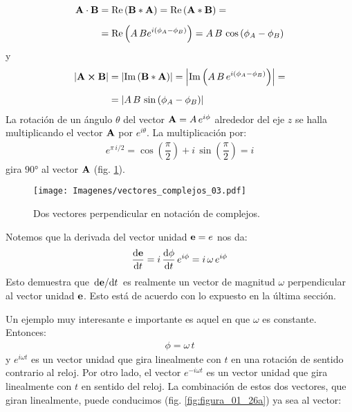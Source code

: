 \documentclass[12pt]{article}
\begin{document}
\begin{align}
\begin{aligned}[b]
    \vb{A} \cdot \vb{B} &= \Re \left( \vb{B} * \vb{A} \right) = \Re \left( \vb{A} * \vb{B} \right) = \\[0.5em]
    &= \Re \left( A \, B e^{i ( \phi_{A} - \phi_{B})} \right) = A \, B \, \cos \left( \phi_{A} - \phi_{B} \right)
\end{aligned}
\label{eq:ecuacion_01_88}
\end{align}
y
\begin{align}
\begin{aligned}[b]
    \abs{ \vb{A} \cp \vb{B}} &= \abs{ \Im \left( \vb{B} * \vb{A} \right) } = \abs{ \Im \left( A \, B \, e^{i (\phi_{A} - \phi_{B})} \right)} = \\[0.5em]
    &= \abs{ A \, B \, \sin \left( \phi_{A} - \phi_{B} \right)}
\end{aligned}
\label{eq:ecuacion_01_89}
\end{align}
La rotación de un ángulo $\theta$ del vector $\vb{A} = A \, e^{i \phi}$ alrededor del eje $z$ se halla multiplicando el vector $\vb{A}$ por $e^{i \theta}$. La multiplicación por:
\begin{align*}
    e^{\pi \, i /2} = \cos \left( \dfrac{\pi}{2} \right) +  i \, \sin \left( \dfrac{\pi}{2} \right) = i
\end{align*}
gira $\ang{90}$ al vector $\vb{A}$ (fig. \ref{fig:figura_01_25}). 
\begin{figure}[H]
    \centering
    \texttt{[image: Imagenes/vectores\_complejos\_03.pdf]}
    \caption{Dos vectores perpendicular en notación de complejos.}
    \label{fig:figura_01_25}
\end{figure}
Notemos que la derivada del vector unidad $\vb{e} = e$ nos da:
\begin{align*}
    \dv{\vb{e}}{t} = i \, \dv{\phi}{t} \, e^{i \phi} = i \, \omega \, e^{i \phi}
\end{align*}
Esto demuestra que $\dv*{\vb{e}}{t}$ es realmente un vector de magnitud $\omega$ perpendicular al vector unidad $\vb{e}$. Esto está de acuerdo con lo expuesto en la última sección.
\par
Un ejemplo muy interesante e importante es aquel en que $\omega$ es constante. Entonces:
\begin{align}
    \phi = \omega \, t
    \label{eq:ecuacion_01_90}
\end{align}
y $e^{i \omega t}$ es un vector unidad que gira linealmente con $t$ en una rotación de sentido contrario al reloj. Por otro lado, el vector $e^{-i \omega t}$ es un vector unidad que gira linealmente con $t$ en sentido del reloj. La combinación de estos dos vectores, que giran linealmente, puede conducimos (fig. \ref{fig:figura_01_26a}) ya sea al vector:
\end{document}
